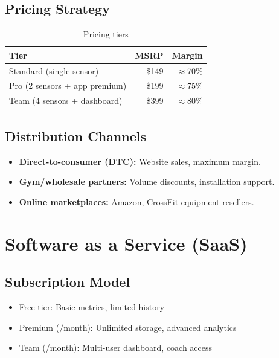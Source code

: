 \subsection{Pricing Strategy}

\begin{table}[h]
    \centering
    \caption{Pricing tiers}
    \label{tab:pricing}
    \begin{tabular}{lrr}
        \toprule
        \textbf{Tier} & \textbf{MSRP} & \textbf{Margin} \\
        \midrule
        Standard (single sensor) & \$149 & $\approx$70\% \\
        Pro (2 sensors + app premium) & \$199 & $\approx$75\% \\
        Team (4 sensors + dashboard) & \$399 & $\approx$80\% \\
        \bottomrule
    \end{tabular}
\end{table}

\subsection{Distribution Channels}

\begin{itemize}
    \item \textbf{Direct-to-consumer (DTC):} Website sales, maximum margin.
    \item \textbf{Gym/wholesale partners:} Volume discounts, installation support.
    \item \textbf{Online marketplaces:} Amazon, CrossFit equipment resellers.
\end{itemize}

\section{Software as a Service (SaaS)}

\subsection{Subscription Model}

\begin{itemize}
    \item Free tier: Basic metrics, limited history
    \item Premium (/month): Unlimited storage, advanced analytics
    \item Team (/month): Multi-user dashboard, coach access
\end{itemize}

